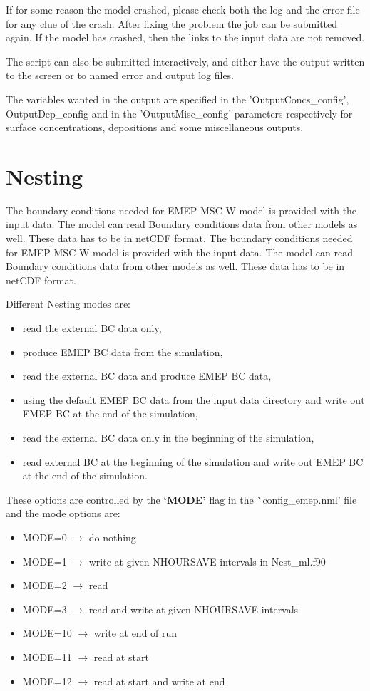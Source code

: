 If for some reason the model crashed, please check both the log and the error 
file for any clue of the crash. After fixing the problem the job can be 
submitted again. If the model has crashed, then the links to the input data 
are not removed. 

The script can also be submitted interactively, and either have the output 
written to the screen or to named error and output log files. 


The variables wanted in the output are specified in the 'OutputConcs\_config', 
OutputDep\_config and in the 'OutputMisc\_config' parameters respectively for 
surface concentrations, depositions and some miscellaneous outputs.  


\section{Nesting}
\label{sec:nesting}

The boundary conditions needed for EMEP  MSC-W model is provided with the input data. 
The model can read Boundary conditions data from other models as well.  These data has
to be in netCDF format.  The boundary conditions needed for EMEP  MSC-W model is provided with the 	input data.  The model can read Boundary conditions data from other models as well. 
These data has to be in netCDF format.  

Different Nesting modes are:

\begin{itemize}			
\item read the external BC data only,
\item produce EMEP BC data from the simulation, 
\item read the external BC data and produce EMEP BC data, 
\item using the default EMEP BC data from the input data directory and write out EMEP BC at the end of the simulation, 
\item read the external BC data only in the beginning of the simulation,
\item read external BC at the beginning of the simulation and write out EMEP BC at the end of the simulation.   	
\end{itemize}	

These options are controlled by the {\bf`MODE'} flag  in the {\textbf `config\_emep.nml'} file and the mode options are:

\begin{itemize}
\item MODE=0   ${\rightarrow}$  do nothing
\item MODE=1   ${\rightarrow}$  write at given NHOURSAVE intervals in Nest\_ml.f90  
\item MODE=2   ${\rightarrow}$  read 
\item MODE=3   ${\rightarrow}$  read and write at given NHOURSAVE intervals 
\item MODE=10  ${\rightarrow}$  write at end of run 
\item MODE=11  ${\rightarrow}$  read at start
\item MODE=12  ${\rightarrow}$ read at start and write at end 
\end{itemize}


